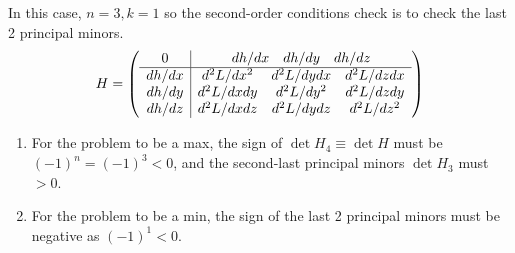 \documentclass[10pt,a4paper]{book}
\theoremstyle{definition}\newtheorem{definition}{Definition}
\theoremstyle{definition}\newtheorem{fact}{Fact}
\theoremstyle{definition}\newtheorem{ex}{Ex.}
\theoremstyle{definition}\newtheorem{project}{Project}
\theoremstyle{definition}\newtheorem{problem}{Problem}
\theoremstyle{definition}\newtheorem{example}{Example}
\numberwithin{theorem}{chapter}
\numberwithin{corollary}{chapter}
\numberwithin{assumption}{chapter}
\numberwithin{definition}{chapter}
\numberwithin{prop}{chapter}
\numberwithin{notation}{chapter}
\numberwithin{problem}{chapter}
\numberwithin{example}{chapter}
\numberwithin{fact}{chapter}
\numberwithin{ex}{chapter}
\begin{document}
	In this case, $n=3, k =1$ so the second-order conditions check is to check the last 2 principal minors. 
	\begin{align*}
		H = \left(
		\begin{array}{c | c }
			0 & \begin{matrix}
				dh/dx         & dh/dy       & dh/dz         
			\end{matrix} \\
			\hline
			\begin{matrix}
				dh/dx \\ dh/dy \\ dh/dz
			\end{matrix} & 
			\begin{matrix}
				d^2 L / dx^2  & d^2 L/ dydx & d^2 L / dz dx \\
				d^2 L / dx dy & d^2 L/ dy^2 & d^2 L / dz dy \\
				d^2 L / dxdz  & d^2 L/ dydz & d^2 L / dz^2  \\
			\end{matrix}
		\end{array}
		\right)
	\end{align*}
	\begin{enumerate}
		\item For the problem to be a max, the sign of $\det H_{4} \equiv \det H$ must be $(-1)^n = (-1)^3 < 0$, and the second-last principal minors $\det H_3$ must $>0$.
		\item For the problem to be a min, the sign of the last 2 principal minors must be negative as $(-1)^1 < 0$.
	\end{enumerate}
	
\end{document}
